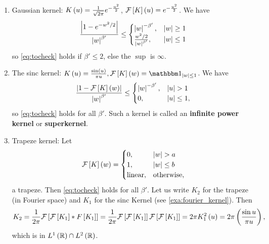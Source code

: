 \begin{example}\label{exa:fourier_kernel}
	\begin{enumerate}
		\item Gaussian kernel: $K\left(u\right) = \frac{1}{\sqrt{2\pi}} e^{-\frac{u^2}{2}}$, $\mathcal{F}\left[K\right]\left(u\right) = e^{-\frac{u^2}{2}}$. We have
		      \begin{equation*}
		      	\frac{\left| 1-e^{-w^2 /2 }\right|}{\left| w\right|^{\beta'}} \leq \begin{cases} \left| w\right|^{-\beta'}, &\left| w\right|\geq 1\\
		      	\frac{w^2/2}{\left| w\right|^{\beta'}}, &\left| w\right|\leq 1 \end{cases}
		      \end{equation*}
		      so \ref{eq:tocheck} holds if $\beta'\leq 2$, else the $\sup$ is $\infty$.
		\item The sinc kernel: $K\pa{u} = \frac{\sin\pa{u}}{\pi u}, \F\bra{K}\pa{w}= \one_{\abs{w}\leq 1}$. We have
		      \begin{equation*}
		      	\frac{\abs{1- \F\bra{K}\pa{w}}}{\abs{w}^{\beta'}} \leq \begin{cases}
		      	\abs{w}^{-\beta'}, & \abs{u}> 1\\
		      	0, & \abs{u}\leq 1,
		      	\end{cases}
		      \end{equation*}
		      so \ref{eq:tocheck} holds for all $\beta'$. Such a kernel is called an \textbf{infinite power kernel} or \textbf{superkernel}.
		\item Trapeze kernel: Let \begin{equation*}
		      \mathcal{F}\left[K\right]\left(w\right) = \begin{cases}
		      0, & \left| w\right| >a\\
		      1, & \left| w\right|\leq b \\
		      \text{linear}, &\text{otherwise},
		\end{cases}
		\end{equation*}
		a trapeze. Then \ref{eq:tocheck} holds for all $\beta'$.
		Let us write $K_2$ for the trapeze (in Fourier space) and $K_1$ for the sinc Kernel (see \ref{exa:fourier_kernel}). Then
		\begin{equation*}
			K_2 = \frac{1}{2\pi} \mathcal{F}\left[\mathcal{F}\left[K_1\right]\ast F\left[K_1\right]\right] = \frac{1}{2\pi} \mathcal{F}\left[\mathcal{F}\left[K_1\right]\right]\mathcal{F}\left[\mathcal{F}\left[K_1\right]\right] = 2\pi K_1^2\left(u\right) = 2\pi \left(\frac{\sin u}{\pi u}\right),
		\end{equation*}
		which is in $L^1\left(\mathbb{R}\right)\cap L^2\left(\mathbb{R}\right)$.
	\end{enumerate}
\end{example}
